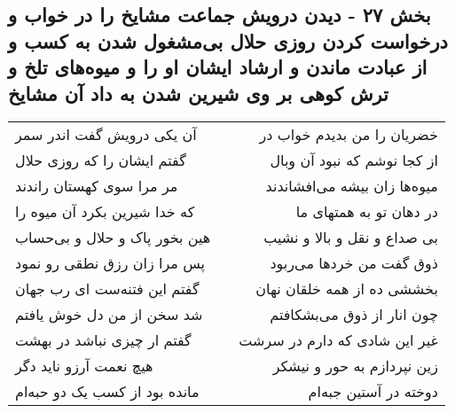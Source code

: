 \begin{center}
\section*{بخش ۲۷ - دیدن درویش جماعت مشایخ را در  خواب و درخواست کردن روزی حلال بی‌مشغول شدن به کسب و از عبادت ماندن و ارشاد ایشان او را و میوه‌های تلخ و ترش کوهی بر وی شیرین شدن به داد آن مشایخ}
\label{sec:sh027}
\begin{longtable}{l p{0.5cm} r}
آن یکی درویش گفت اندر سمر
&&
خضریان را من بدیدم خواب در
\\
گفتم ایشان را که روزی حلال
&&
از کجا نوشم که نبود آن وبال
\\
مر مرا سوی کهستان راندند
&&
میوه‌ها زان بیشه می‌افشاندند
\\
که خدا شیرین بکرد آن میوه را
&&
در دهان تو به همتهای ما
\\
هین بخور پاک و حلال و بی‌حساب
&&
بی صداع و نقل و بالا و نشیب
\\
پس مرا زان رزق نطقی رو نمود
&&
ذوق گفت من خردها می‌ربود
\\
گفتم این فتنه‌ست ای رب جهان
&&
بخششی ده از همه خلقان نهان
\\
شد سخن از من دل خوش یافتم
&&
چون انار از ذوق می‌بشکافتم
\\
گفتم ار چیزی نباشد در بهشت
&&
غیر این شادی که دارم در سرشت
\\
هیچ نعمت آرزو ناید دگر
&&
زین نپردازم به حور و نیشکر
\\
مانده بود از کسب یک دو حبه‌ام
&&
دوخته در آستین جبه‌ام
\\
\end{longtable}
\end{center}
